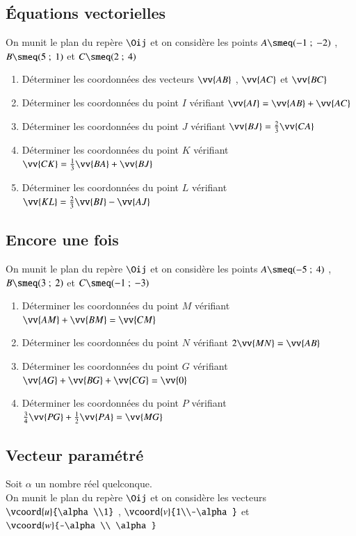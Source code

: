 \documentclass[oneside,12pt]{article}          %
\begin{document}
\subsection{Équations vectorielles}
On munit le plan du repère $\Oij$ et on considère les points $A\smeq(-1~;~-2)$ , $B\smeq(5~;~1)$ et $C\smeq(2~;~4)$
\begin{enumerate}
	\item Déterminer les coordonnées des vecteurs $\vv{AB}$ , $\vv{AC}$ et $\vv{BC}$
	\item Déterminer les coordonnées du point $I$ vérifiant $\vv{AI}=\vv{AB}+\vv{AC}$
	\item Déterminer les coordonnées du point $J$ vérifiant $\vv{BJ}=\frac{2}{3}\vv{CA}$
	\item Déterminer les coordonnées du point $K$ vérifiant $\vv{CK}=\frac{1}{3}\vv{BA}+\vv{BJ}$
	\item Déterminer les coordonnées du point $L$ vérifiant $\vv{KL}=\frac{2}{3}\vv{BI}-\vv{AJ}$
\end{enumerate}



\subsection{Encore une fois}
On munit le plan du repère $\Oij$ et on considère les points $A\smeq(-5~;~4)$ , $B\smeq(3~;~2)$ et $C\smeq(-1~;~-3)$
\begin{enumerate}
	\item Déterminer les coordonnées du point $M$ vérifiant $\vv{AM}+\vv{BM}=\vv{CM}$
	\item Déterminer les coordonnées du point $N$ vérifiant $2\vv{MN}=\vv{AB}$
	\item Déterminer les coordonnées du point $G$ vérifiant $\vv{AG}+\vv{BG}+\vv{CG}=\vv{0}$
	\item Déterminer les coordonnées du point $P$ vérifiant $\frac{3}{4}\vv{PG}+\frac{1}{2}\vv{PA}=\vv{MG}$
\end{enumerate}



\subsection{Vecteur paramétré}
Soit $\alpha$ un nombre réel quelconque.\\
On munit le plan du repère $\Oij$ et on considère les vecteurs $\vcoord{u}{\alpha\\1}$ , $\vcoord{v}{1\\-\alpha}$ et $\vcoord{w}{-\alpha\\ \alpha}$
\end{document}
